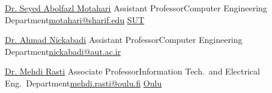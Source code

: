 
\newcommand{\refskip}{\enskip\cdotp\enskip}
\newcommand{\cesuffix}{{\refskip}Computer Engineering Department}

\begin{cvhonors}

  \cvref
    {\href{https://scholar.google.com/citations?user=rJ-biB0AAAAJ&hl=en}{Dr. Seyed Abolfazl Motahari}} %
    {Assistant Professor\cesuffix\refskip\href{mailto:motahari@sharif.edu}{motahari@sharif.edu}} %
    {\href{https://www.sharif.edu}{SUT}} %

  \cvref
    {\href{https://scholar.google.com/citations?user=pSMNSZwAAAAJ&hl=en}{Dr. Ahmad Nickabadi}} %
    {Assistant Professor\cesuffix\refskip\href{mailto:nickabadi@aut.ac.ir}{nickabadi@aut.ac.ir}} %
    {} %

  \cvref
    {\href{https://scholar.google.com/citations?user=zb8pjMYAAAAJ&hl=en}{Dr. Mehdi Rasti}} %
    {Associate Professor{\refskip}Information Tech.~and Electrical Eng.~Department\refskip\href{mailto:mehdi.rasti@oulu.fi}{mehdi.rasti@oulu.fi}} %
    {\href{https://www.oulu.fi/en}{Oulu}} %




\end{cvhonors}

